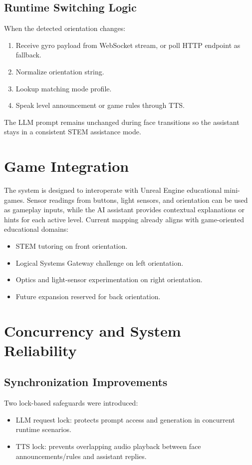 \documentclass[12pt,a4paper]{article}
\begin{document}
\subsection{Runtime Switching Logic}
When the detected orientation changes:
\begin{enumerate}
    \item Receive gyro payload from WebSocket stream, or poll HTTP endpoint as fallback.
    \item Normalize orientation string.
    \item Lookup matching mode profile.
    \item Speak level announcement or game rules through TTS.
\end{enumerate}

The LLM prompt remains unchanged during face transitions so the assistant stays in a consistent STEM assistance mode.

\section{Game Integration}
The system is designed to interoperate with Unreal Engine educational mini-games. Sensor readings from buttons, light sensors, and orientation can be used as gameplay inputs, while the AI assistant provides contextual explanations or hints for each active level. Current mapping already aligns with game-oriented educational domains:
\begin{itemize}
    \item STEM tutoring on front orientation.
    \item Logical Systems Gateway challenge on left orientation.
    \item Optics and light-sensor experimentation on right orientation.
    \item Future expansion reserved for back orientation.
\end{itemize}

\section{Concurrency and System Reliability}

\subsection{Synchronization Improvements}
Two lock-based safeguards were introduced:
\begin{itemize}
    \item LLM request lock: protects prompt access and generation in concurrent runtime scenarios.
    \item TTS lock: prevents overlapping audio playback between face announcements/rules and assistant replies.
\end{itemize}
\end{document}
